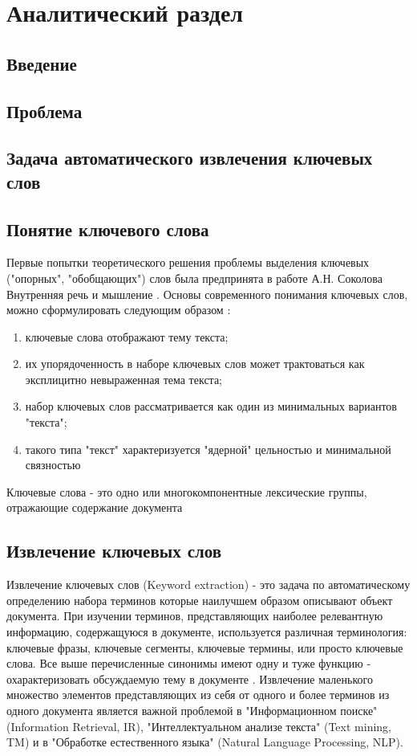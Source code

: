\section{Аналитический раздел}

\subsection{Введение}

\subsection{Проблема }
\subsection{Задача автоматического извлечения ключевых слов}



\subsection{Понятие ключевого слова}

Первые попытки теоретического решения проблемы выделения ключевых ("опорных", "обобщающих") слов была предпринята в работе А.Н. Соколова Внутренняя речь и мышление \cite{6}.
Основы современного понимания ключевых слов, можно сформулировать следующим образом \cite{7}:
\begin{enumerate}
	\item ключевые слова отображают тему текста;
	\item их упорядоченность в наборе ключевых слов может трактоваться как эксплицитно невыраженная тема текста;
	\item набор ключевых слов рассматривается как один из минимальных вариантов "текста";
	\item такого типа "текст" характеризуется "ядерной" цельностью и минимальной связностью
\end{enumerate}

Ключевые слова - это одно или многокомпонентные лексические группы, отражающие содержание документа \cite{3}

\subsection{Извлечение ключевых слов}

Извлечение ключевых слов (Keyword extraction) - это задача по автоматическому определению набора терминов которые наилучшем образом описывают объект документа.
При изучении терминов, представляющих наиболее релевантную информацию, содержащуюся в документе, используется различная терминология: ключевые фразы, ключевые сегменты, ключевые термины, или просто ключевые слова.
Все выше перечисленные синонимы имеют одну и туже функцию - охарактеризовать обсуждаемую тему в документе \cite{4}.
Извлечение маленького множество элементов представляющих из себя от одного и более терминов из одного документа является важной проблемой в "Информационном поиске" (Information Retrieval, IR), "Интеллектуальном анализе текста" (Text mining, TM) и в "Обработке естественного языка" (Natural Language Processing, NLP).


